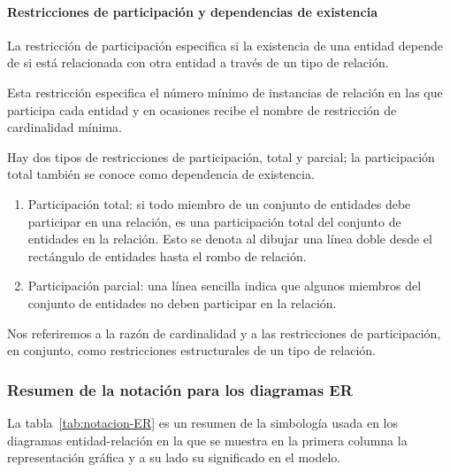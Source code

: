 \paragraph*{Restricciones de participación y dependencias de existencia}
La restricción de participación especifica si la existencia de una entidad depende de si está relacionada con otra entidad a través de un tipo de relación.


Esta restricción especifica el número mínimo de instancias de relación en las que participa cada entidad y en ocasiones recibe el nombre de restricción de cardinalidad mínima.


Hay dos tipos de restricciones de participación, total y parcial; la participación total también se conoce como dependencia de existencia.

\begin{enumerate}
    \item Participación total: si todo miembro de un conjunto de entidades debe participar en una relación, es una participación total del conjunto de entidades en la relación. Esto se denota al dibujar una línea doble desde el rectángulo de entidades hasta el rombo de relación.
    \item Participación parcial: una línea sencilla indica que algunos miembros del conjunto de entidades no deben participar en la relación.
    \end{enumerate}

Nos referiremos a la razón de cardinalidad y a las restricciones de participación, en conjunto, como restricciones estructurales de un tipo de relación.





\subsubsection{Resumen de la notación para los diagramas ER}


La tabla~\ref{tab:notacion-ER} es un resumen de la simbología usada en los diagramas entidad-relación en la que se muestra en la primera columna la representación gráfica y a su lado su significado en el modelo.

